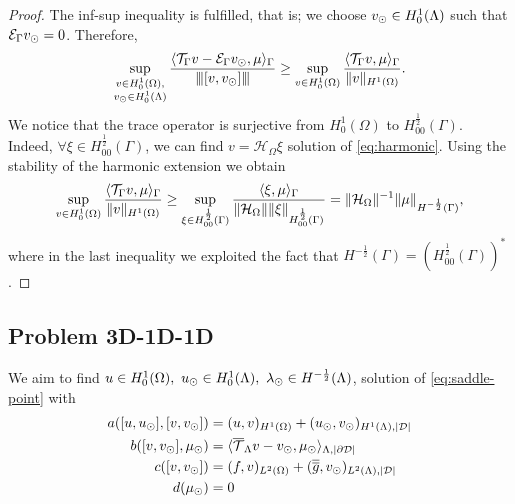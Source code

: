 \begin{proof}
The inf-sup inequality is fulfilled, that is; 
we choose $v_{\odot} \in H^1_0(\Lambda)$ such that $\mathcal{E}_\Gamma v_{\odot} =0$. Therefore,
\begin{equation*}
\sup _{\substack{v\in H^1_0(\Omega),\\ v_{\odot} \in H^1_0(\Lambda)}} \frac{ \langle {\mathcal{T}_\Gamma} v  - \mathcal{E}_\Gamma v_{\odot}, \mu\rangle_\Gamma}{{\left\vert\kern-0.25ex\left\vert\kern-0.25ex\left\vert [v, v_{\odot}] \right\vert\kern-0.25ex\right\vert\kern-0.25ex\right\vert}} 
\geq \sup _{v\in H^1_0(\Omega)} \frac{ \langle {\mathcal{T}_\Gamma} v, \mu \rangle_\Gamma}{\|v\|_{H^1(\Omega)}}.
\end{equation*}
We notice that the trace operator is surjective from $H^1_0(\Omega)$ to $H^{\frac12}_{00}(\Gamma)$. Indeed, $\forall \xi \in H^{\frac 12}_{00}(\Gamma)$, 
we  can find $v=\mathcal{H}_\Omega \xi$ solution of \eqref{eq:harmonic}. Using the stability of the harmonic extension we obtain
\begin{equation}\label{infsup_traceop}
\sup _{v\in H^1_0(\Omega)} \frac{ \langle \trace v, \mu \rangle_\Gamma}{\|v\|_{H^1(\Omega)}}
\geq  \sup _{\xi \in H^{\frac 12}_{00}(\Gamma )} \frac{ \langle \xi , \mu \rangle_\Gamma}{\|\mathcal{H}_\Omega\| \|\xi\|_{H^{\frac 12}_{00}(\Gamma)}}
= \|\mathcal{H}_\Omega\|^{-1} \|\mu\|_{H^{-\frac 12}(\Gamma)},
\end{equation}
where in the last inequality we exploited the fact that $H^{-\frac 12}(\Gamma)=(H^{\frac 12 }_{00}(\Gamma))^*$. 
\end{proof}


\subsection{Problem 3D-1D-1D}
We aim to find $u \in H^1_0(\Omega),\ u_{\odot} \in H^1_0(\Lambda), \ \lambda_{\odot} \in H^{-\frac12}(\Lambda)$,
solution of \eqref{eq:saddle-point} with
\begin{align*}
a([u, u_{\odot}], [v, v_{\odot}])&= (u,v)_{H^1(\Omega)} + (u_{\odot},v_{\odot})_{H^1(\Lambda),|\mathcal{D}|}
\\
b([v, v_{\odot}], \mu_{\odot})&=  \langle  {\overline{\mathcal{T}}_\Lambda} v - v_{\odot}, \mu_{\odot} \rangle_{\Lambda, |\partial\mathcal{D}|} 
\\
c([v,v_{\odot}])&= (f,v)_{L^2(\Omega)} + (\overline{\overline{g}},v_{\odot})_{L^2(\Lambda),|\mathcal{D}|}
\\
d(\mu_{\odot})&=0
\end{align*}


